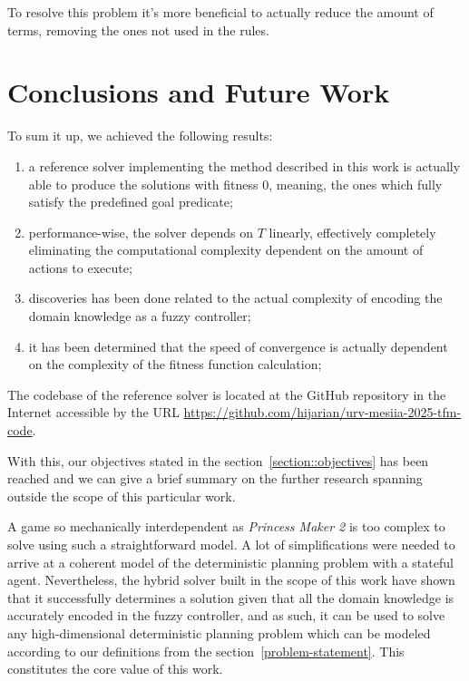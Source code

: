 \documentclass[12pt, a4paper]{report}
\begin{document}
	To resolve this problem it's more beneficial to actually reduce the amount of terms, removing the ones not used in the rules.
	


	
	\chapter{Conclusions and Future Work}\label{section::conclusions}

	To sum it up, we achieved the following results:
	
	\begin{enumerate}
		\item a reference solver implementing the method described in this work is actually able to produce the solutions with fitness 0, meaning, the ones which fully satisfy the predefined goal predicate;
		\item performance-wise, the solver depends on $T$ linearly, effectively completely eliminating the computational complexity dependent on the amount of actions to execute;
		\item discoveries has been done related to the actual complexity of encoding the domain knowledge as a fuzzy controller;
		\item it has been determined that the speed of convergence is actually dependent on the complexity of the fitness function calculation;
	\end{enumerate}
	
	The codebase of the reference solver is located at the GitHub repository in the Internet accessible by the URL \url{https://github.com/hijarian/urv-mesiia-2025-tfm-code}.
	
	With this, our objectives stated in the section~\ref{section::objectives} has been reached and we can give a brief summary on the further research spanning outside the scope of this particular work.
	
	A game so mechanically interdependent as \textit{Princess Maker 2} is too complex to solve using such a straightforward model.
	A lot of simplifications were needed to arrive at a coherent model of the deterministic planning problem with a stateful agent.
	Nevertheless, the hybrid solver built in the scope of this work have shown that it successfully determines a solution given that all the domain knowledge is accurately encoded in the fuzzy controller, and as such, it can be used to solve any high-dimensional deterministic planning problem which can be modeled according to our definitions from the section~\ref{problem-statement}.
	This constitutes the core value of this work.
	
\end{document}
